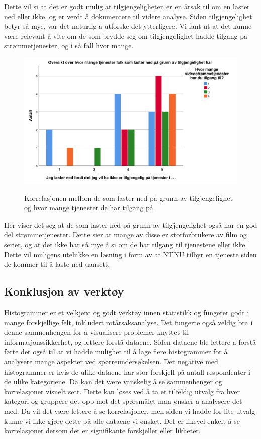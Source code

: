 Dette vil si at det er godt mulig at tilgjengeligheten er en årsak til om en laster ned eller ikke, og er verdt å dokumentere til videre analyse. Siden tilgjengelighet betyr så mye, var det naturlig å utforske det ytterligere. Vi fant ut at det kunne være relevant å vite om de som brydde seg om tilgjengelighet hadde tilgang på strømmetjenester, og i så fall hvor mange.

\begin{figure}[H]
    \centering
    \includegraphics[scale=0.45]{case_1/bilder/tilgjengelighet_antallstromming.pdf}
    \label{fig:tilgjengelighet_antallstromming}
    \caption[Tilgjengelighet vs antall strømmetjenester]{Korrelasjonen mellom de som laster ned på grunn av tilgjengelighet og hvor mange tjenester de har tilgang på}
\end{figure}

Her viser det seg at de som laster ned på grunn av tilgjengelighet også har en god del strømmetjenester. Dette sier at mange av disse er storforbrukere av film og serier, og at det ikke har så mye å si om de har tilgang til tjenestene eller ikke. Dette vil muligens utelukke en løsning i form av at NTNU tilbyr en tjeneste siden de kommer til å laste ned uansett.

\subsection{Konklusjon av verktøy}
Histogrammer er et velkjent og godt verktøy innen statistikk og fungerer godt i mange forskjellige felt, inkludert rotårsaksanalyse.  Det fungerte også veldig bra i denne sammenhengen for å visualisere problemer knyttet til informasjonssikkerhet, og lettere forstå dataene. Siden dataene ble lettere å forstå førte det også til at vi hadde mulighet til å lage flere histogrammer for å analysere mange aspekter ved spørreundersøkelsen. Det negative med histogrammer er hvis de ulike dataene har stor forskjell på antall respondenter i de ulike kategoriene. Da kan det være vanskelig å se sammenhenger og korrelasjoner visuelt sett. Dette kan løses ved å ta et tilfeldig utvalg fra hver kategori og gruppere det opp mot det spørsmålet man ønsker å analysere det med. Da vil det være lettere å se korrelasjoner, men siden vi hadde for lite utvalg kunne vi ikke gjøre dette på alle dataene vi ønsket. Det er likevel enkelt å se korrelasjoner dersom det er signifikante forskjeller eller likheter.

